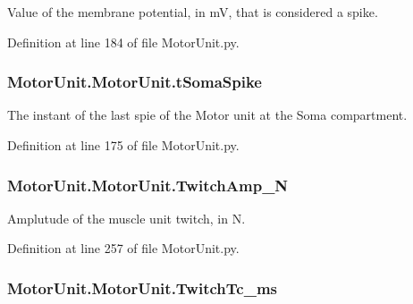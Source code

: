 Value of the membrane potential, in m\-V, that is considered a spike. 



Definition at line 184 of file Motor\-Unit.\-py.

\hypertarget{class_motor_unit_1_1_motor_unit_abca82ec2c7312bb475989bb45e82ca28}{
\subsubsection[{t\-Soma\-Spike}]{\setlength{\rightskip}{0pt plus 5cm}Motor\-Unit.\-Motor\-Unit.\-t\-Soma\-Spike}}\label{class_motor_unit_1_1_motor_unit_abca82ec2c7312bb475989bb45e82ca28}


The instant of the last spie of the Motor unit at the Soma compartment. 



Definition at line 175 of file Motor\-Unit.\-py.

\hypertarget{class_motor_unit_1_1_motor_unit_ad14af870eb3dd7468041853f2c6e8cab}{
\subsubsection[{Twitch\-Amp\-\_\-\-N}]{\setlength{\rightskip}{0pt plus 5cm}Motor\-Unit.\-Motor\-Unit.\-Twitch\-Amp\-\_\-\-N}}\label{class_motor_unit_1_1_motor_unit_ad14af870eb3dd7468041853f2c6e8cab}


Amplutude of the muscle unit twitch, in N. 



Definition at line 257 of file Motor\-Unit.\-py.

\hypertarget{class_motor_unit_1_1_motor_unit_a083581c89ebb964e58721667307dd2bc}{
\subsubsection[{Twitch\-Tc\-\_\-ms}]{\setlength{\rightskip}{0pt plus 5cm}Motor\-Unit.\-Motor\-Unit.\-Twitch\-Tc\-\_\-ms}}\label{class_motor_unit_1_1_motor_unit_a083581c89ebb964e58721667307dd2bc}


